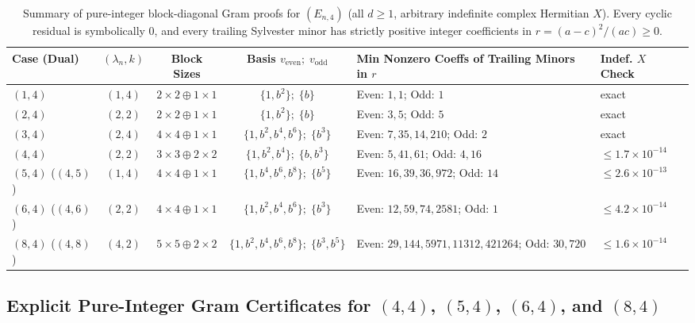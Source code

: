 \documentclass[11pt,a4paper]{article}
\theoremstyle{remark}
\begin{document}
\begin{table}[!htbp]
\centering
\caption{Summary of pure-integer block-diagonal Gram proofs for $(E_{n,4})$ (all $d\ge 1$, arbitrary indefinite complex Hermitian $X$). Every cyclic residual is symbolically $0$, and every trailing Sylvester minor has strictly positive integer coefficients in $r=(a-c)^2/(ac)\ge 0$.}
\label{tab:m4_summary}
\begin{tabularx}{\linewidth}{lcccXl}
\toprule
Case (Dual) & $(\lambda_n, k)$ & Block Sizes & Basis $v_{\mathrm{even}};\; v_{\mathrm{odd}}$ & Min Nonzero Coeffs of Trailing Minors in $r$ & Indef. $X$ Check \\
\midrule
$(1,4)$ & $(1,4)$ & $2\times 2 \oplus 1\times 1$ & $\{1,b^2\};\;\{b\}$ & Even: $1, 1$; Odd: $1$ & exact \\
$(2,4)$ & $(2,2)$ & $2\times 2 \oplus 1\times 1$ & $\{1,b^2\};\;\{b\}$ & Even: $3, 5$; Odd: $5$ & exact \\
$(3,4)$ & $(2,4)$ & $4\times 4 \oplus 1\times 1$ & $\{1,b^2,b^4,b^6\};\;\{b^3\}$ & Even: $7, 35, 14, 210$; Odd: $2$ & exact \\
$(4,4)$ & $(2,2)$ & $3\times 3 \oplus 2\times 2$ & $\{1,b^2,b^4\};\;\{b,b^3\}$ & Even: $5, 41, 61$; Odd: $4, 16$ & $\le 1.7\times 10^{-14}$ \\
$(5,4)$ ($(4,5)$) & $(1,4)$ & $4\times 4 \oplus 1\times 1$ & $\{1,b^4,b^6,b^8\};\;\{b^5\}$ & Even: $16, 39, 36, 972$; Odd: $14$ & $\le 2.6\times 10^{-13}$ \\
$(6,4)$ ($(4,6)$) & $(2,2)$ & $4\times 4 \oplus 1\times 1$ & $\{1,b^2,b^4,b^6\};\;\{b^3\}$ & Even: $12, 59, 74, 2581$; Odd: $1$ & $\le 4.2\times 10^{-14}$ \\
$(8,4)$ ($(4,8)$) & $(4,2)$ & $5\times 5 \oplus 2\times 2$ & $\{1,b^2,b^4,b^6,b^8\};\;\{b^3,b^5\}$ & Even: $29, 144, 5971, 11312, 421264$; Odd: $30, 720$ & $\le 1.6\times 10^{-14}$ \\
\bottomrule
\end{tabularx}
\end{table}

\subsection{Explicit Pure-Integer Gram Certificates for $(4,4)$, $(5,4)$, $(6,4)$, and $(8,4)$}
\end{document}
